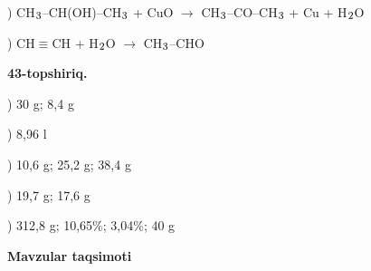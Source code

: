 \documentclass[11pt,a4paper]{article}
\renewcommand{\textsubscript}[1]{\ensuremath{_{\text{\fontsize{8}{8}\selectfont #1}}}}
\begin{document}
) CH\textsubscript{3}--CH(OH)--CH\textsubscript{3} + CuO $\to$ CH\textsubscript{3}--CO--CH\textsubscript{3} + Cu + H\textsubscript{2}O\par
{}) CH$\equiv$CH + H\textsubscript{2}O $\to$ CH\textsubscript{3}--CHO\par
\noindent\textbf{43-topshiriq.}\par
{}) 30 g; 8,4 g\par
{}) 8,96 l\par
{}) 10,6 g; 25,2 g; 38,4 g\par
{}) 19,7 g; 17,6 g\par
{}) 312,8 g; 10,65\%; 3,04\%; 40 g\par
\par\bigskip\noindent\textbf{Mavzular taqsimoti}\par\smallskip
\end{document}
